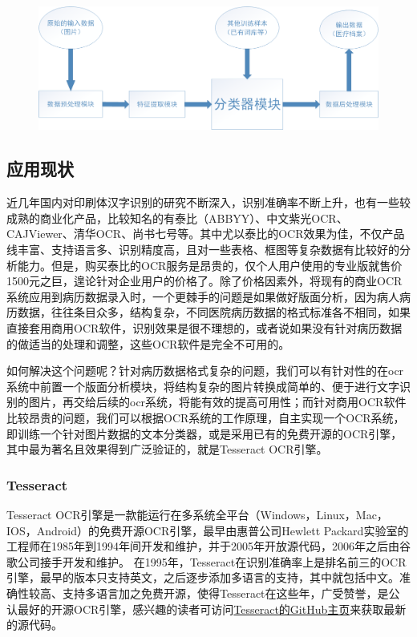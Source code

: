 \begin{figure}
\centering
  \includegraphics[scale=0.3]{figures/ocr-pipeline}
  \label{pic:ocr-pipeline}
\end{figure}

\subsection{应用现状}
近几年国内对印刷体汉字识别的研究不断深入，识别准确率不断上升，也有一些较成熟的商业化产品，比较知名的有泰比（ABBYY）、中文紫光OCR、CAJViewer、清华OCR、尚书七号等。其中尤以泰比的OCR效果为佳，不仅产品线丰富、支持语言多、识别精度高，且对一些表格、框图等复杂数据有比较好的分析能力。但是，购买泰比的OCR服务是昂贵的，仅个人用户使用的专业版就售价1500元之巨，遑论针对企业用户的价格了。除了价格因素外，将现有的商业OCR系统应用到病历数据录入时，一个更棘手的问题是如果做好版面分析，因为病人病历数据，往往条目众多，结构复杂，不同医院病历数据的格式标准各不相同，如果直接套用商用OCR软件，识别效果是很不理想的，或者说如果没有针对病历数据的做适当的处理和调整，这些OCR软件是完全不可用的。

如何解决这个问题呢？针对病历数据格式复杂的问题，我们可以有针对性的在ocr系统中前置一个版面分析模块，将结构复杂的图片转换成简单的、便于进行文字识别的图片，再交给后续的ocr系统，将能有效的提高可用性；而针对商用OCR软件比较昂贵的问题，我们可以根据OCR系统的工作原理，自主实现一个OCR系统，即训练一个针对图片数据的文本分类器，或是采用已有的免费开源的OCR引擎，其中最为著名且效果得到广泛验证的，就是Tesseract OCR引擎。

\subsubsection{Tesseract}
Tesseract OCR引擎是一款能运行在多系统全平台（Windows，Linux，Mac，IOS，Android）的免费开源OCR引擎，最早由惠普公司Hewlett Packard实验室的工程师在1985年到1994年间开发和维护，并于2005年开放源代码，2006年之后由谷歌公司接手开发和维护。
在1995年，Tesseract在识别准确率上是排名前三的OCR引擎，最早的版本只支持英文，之后逐步添加多语言的支持，其中就包括中文。准确性较高、支持多语言加之免费开源，使得Tesseract在这些年，广受赞誉，是公认最好的开源OCR引擎，感兴趣的读者可访问\href{https://github.com/tesseract-ocr/tesseract}{Tesseract的GitHub主页}来获取最新的源代码。

